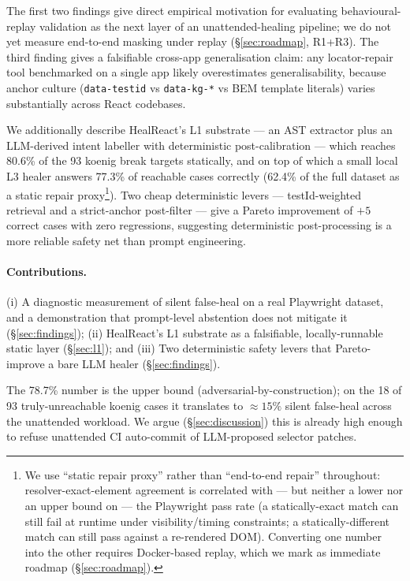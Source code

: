 \noindent The first two findings give direct empirical motivation for evaluating behavioural-replay validation as the next layer of an unattended-healing pipeline; we do not yet measure end-to-end masking under replay (\S\ref{sec:roadmap}, R1+R3). The third finding gives a falsifiable cross-app generalisation claim: any locator-repair tool benchmarked on a single app likely overestimates generalisability, because anchor culture (\texttt{data-testid} vs \texttt{data-kg-*} vs BEM template literals) varies substantially across React codebases.

We additionally describe HealReact's L1 substrate --- an AST extractor plus an LLM-derived intent labeller with deterministic post-calibration --- which reaches 80.6\% of the 93 koenig break targets statically, and on top of which a small local L3 healer answers 77.3\% of reachable cases correctly (62.4\% of the full dataset as a static repair proxy\footnote{We use ``static repair proxy'' rather than ``end-to-end repair'' throughout: resolver-exact-element agreement is correlated with --- but neither a lower nor an upper bound on --- the Playwright pass rate (a statically-exact match can still fail at runtime under visibility/timing constraints; a statically-different match can still pass against a re-rendered DOM). Converting one number into the other requires Docker-based replay, which we mark as immediate roadmap (\S\ref{sec:roadmap}).}). Two cheap deterministic levers --- testId-weighted retrieval and a strict-anchor post-filter --- give a Pareto improvement of $+5$ correct cases with zero regressions, suggesting deterministic post-processing is a more reliable safety net than prompt engineering.

\paragraph{Contributions.}
(i) A diagnostic measurement of silent false-heal on a real Playwright dataset, and a demonstration that prompt-level abstention does not mitigate it (\S\ref{sec:findings});
(ii) HealReact's L1 substrate as a falsifiable, locally-runnable static layer (\S\ref{sec:l1}); and
(iii) Two deterministic safety levers that Pareto-improve a bare LLM healer (\S\ref{sec:findings}).

The 78.7\% number is the upper bound (adversarial-by-construction); on the 18 of 93 truly-unreachable koenig cases it translates to $\approx 15\%$ silent false-heal across the unattended workload. We argue (\S\ref{sec:discussion}) this is already high enough to refuse unattended CI auto-commit of LLM-proposed selector patches.
